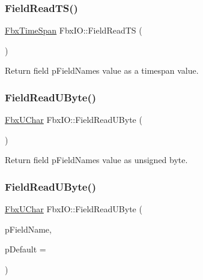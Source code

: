 \subsubsection{\texorpdfstring{Field\+Read\+T\+S()}{FieldReadTS()}\hspace{0.1cm}{\footnotesize\ttfamily [2/2]}}
{\footnotesize\ttfamily \hyperlink{class_fbx_time_span}{Fbx\+Time\+Span} Fbx\+I\+O\+::\+Field\+Read\+TS (\begin{DoxyParamCaption}{ }\end{DoxyParamCaption})}



Return field p\+Field\+Name\textquotesingle{}s value as a timespan value. 

\mbox{\label{class_fbx_i_o_aad3f43e21757a60def0213926a611874}} 
\subsubsection{\texorpdfstring{Field\+Read\+U\+Byte()}{FieldReadUByte()}\hspace{0.1cm}{\footnotesize\ttfamily [1/2]}}
{\footnotesize\ttfamily \hyperlink{fbxtypes_8h_a1be3cadf61e76f49142eb83e66ffe8bd}{Fbx\+U\+Char} Fbx\+I\+O\+::\+Field\+Read\+U\+Byte (\begin{DoxyParamCaption}{ }\end{DoxyParamCaption})}



Return field p\+Field\+Name\textquotesingle{}s value as unsigned byte. 

\mbox{\label{class_fbx_i_o_a457b6931e3c7ed96a37813ab8d9d9b35}} 
\subsubsection{\texorpdfstring{Field\+Read\+U\+Byte()}{FieldReadUByte()}\hspace{0.1cm}{\footnotesize\ttfamily [2/2]}}
{\footnotesize\ttfamily \hyperlink{fbxtypes_8h_a1be3cadf61e76f49142eb83e66ffe8bd}{Fbx\+U\+Char} Fbx\+I\+O\+::\+Field\+Read\+U\+Byte (\begin{DoxyParamCaption}\item[{const char $\ast$}]{p\+Field\+Name,  }\item[{\hyperlink{fbxtypes_8h_a1be3cadf61e76f49142eb83e66ffe8bd}{Fbx\+U\+Char}}]{p\+Default = {} }\end{DoxyParamCaption})}

